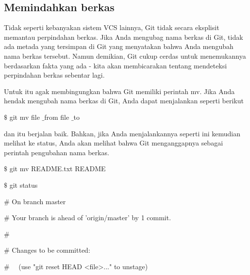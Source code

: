 \subsection {Memindahkan berkas}
\noindent 
{\fontsize{14pt}{14pt}\selectfont Tidak seperti kebanyakan sistem VCS lainnya, Git tidak secara eksplisit memantau perpindahan berkas. Jika Anda mengubag nama berkas di Git, tidak ada metada yang tersimpan di Git yang menyatakan bahwa Anda mengubah nama berkas tersebut. Namun demikian, Git cukup cerdas untuk menemukannya berdasarkan fakta yang ada - kita akan membicarakan tentang mendeteksi perpindahan berkas sebentar lagi. \\} \par
\noindent 
{\fontsize{14pt}{14pt}\selectfont Untuk itu agak membingungkan bahwa Git memiliki perintah $  $mv. Jika Anda hendak mengubah nama berkas di Git, Anda dapat menjalankan seperti berikut \\} \par
\vspace{14pt}
\noindent 
{\fontsize{14pt}{14pt}\selectfont  $  \$  $ git mv file $  \_  $from file $  \_  $to \\} \par
\noindent 
{\fontsize{14pt}{14pt}\selectfont dan itu berjalan baik. Bahkan, jika Anda menjalankannya seperti ini kemudian melihat ke status, Anda akan melihat bahwa Git menganggapnya sebagai perintah pengubahan nama berkas. \\} \par
\noindent 
{\fontsize{14pt}{14pt}\selectfont  $  \$  $ git mv README.txt README \\} \par
\noindent 
{\fontsize{14pt}{14pt}\selectfont  $  \$  $ git status \\} \par
\noindent 
{\fontsize{14pt}{14pt}\selectfont  $  \#  $ On branch master \\} \par
\noindent 
{\fontsize{14pt}{14pt}\selectfont  $  \#  $ Your branch is ahead of 'origin/master' by 1 commit. \\} \par
\noindent 
{\fontsize{14pt}{14pt}\selectfont  $  \#  $ \\} \par
\noindent 
{\fontsize{14pt}{14pt}\selectfont  $  \#  $ Changes to be committed: \\} \par
\noindent 
{\fontsize{14pt}{14pt}\selectfont  $  \#  $~~ (use "git reset HEAD <file>..." to unstage) \\} \par

